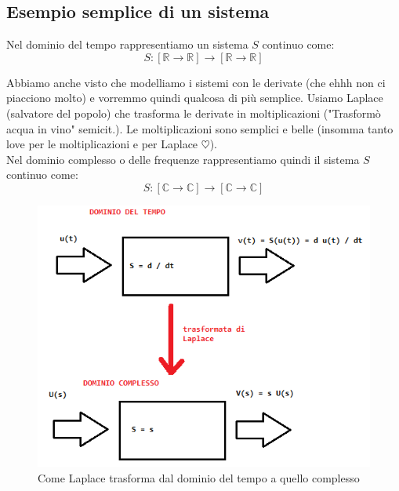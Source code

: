 \subsection*{Esempio semplice di un sistema}

Nel dominio del tempo rappresentiamo un sistema $S$ continuo come: \\
\begin{equation*}
S: [\mathbb{R} \rightarrow \mathbb{R}] \rightarrow [\mathbb{R} \rightarrow \mathbb{R}]
\end{equation*}

Abbiamo anche visto che modelliamo i sistemi con le derivate (che ehhh non ci piacciono molto) e vorremmo quindi qualcosa di più semplice. Usiamo Laplace (salvatore del popolo) che trasforma le derivate in moltiplicazioni ("Trasformò acqua in vino" semicit.). Le moltiplicazioni sono semplici e belle (insomma tanto love per le moltiplicazioni e per Laplace $\heartsuit$).\\

Nel dominio complesso o delle frequenze rappresentiamo quindi il sistema $S$ continuo come: \\
\begin{equation*}
S: [\mathbb{C} \rightarrow \mathbb{C}] \rightarrow [\mathbb{C} \rightarrow \mathbb{C}]
\end{equation*}

\begin{figure}[h]
	\centering
	\includegraphics[width=0.7\linewidth]{immagini/LaplaceLove}
	\caption{ Come Laplace trasforma dal dominio del tempo a quello complesso }
	\label{fig: Sistema Laplace}
\end{figure}

